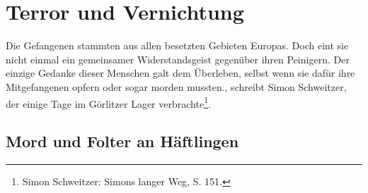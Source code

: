 

\section{Terror und Vernichtung}
\begin{leftbar}
Die Gefangenen stammten aus allen besetzten Gebieten Europas. Doch eint sie nicht einmal ein gemeinsamer Widerstandsgeist gegenüber ihren Peinigern. Der einzige Gedanke dieser Menschen galt dem Überleben, selbst wenn sie dafür ihre Mitgefangenen opfern oder sogar morden mussten.\grqq, schreibt Simon Schweitzer, der einige Tage im Görlitzer Lager verbrachte\footnote{Simon Schweitzer: Simons langer Weg, S. 151.}.
\end{leftbar}


\subsection{Mord und Folter an Häftlingen}

